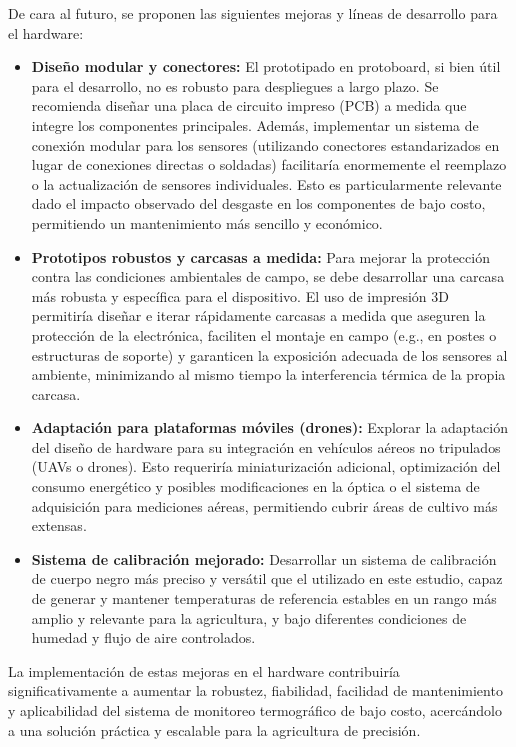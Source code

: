 De cara al futuro, se proponen las siguientes mejoras y líneas de desarrollo para el hardware:
\begin{itemize}
    \item \textbf{Diseño modular y conectores:} El prototipado en protoboard, si bien útil para el desarrollo, no es robusto para despliegues a largo plazo. Se recomienda diseñar una placa de circuito impreso (PCB) a medida que integre los componentes principales. Además, implementar un sistema de conexión modular para los sensores (utilizando conectores estandarizados en lugar de conexiones directas o soldadas) facilitaría enormemente el reemplazo o la actualización de sensores individuales. Esto es particularmente relevante dado el impacto observado del desgaste en los componentes de bajo costo, permitiendo un mantenimiento más sencillo y económico.
    \item \textbf{Prototipos robustos y carcasas a medida:} Para mejorar la protección contra las condiciones ambientales de campo, se debe desarrollar una carcasa más robusta y específica para el dispositivo. El uso de impresión 3D permitiría diseñar e iterar rápidamente carcasas a medida que aseguren la protección de la electrónica, faciliten el montaje en campo (e.g., en postes o estructuras de soporte) y garanticen la exposición adecuada de los sensores al ambiente, minimizando al mismo tiempo la interferencia térmica de la propia carcasa.
    \item \textbf{Adaptación para plataformas móviles (drones):} Explorar la adaptación del diseño de hardware para su integración en vehículos aéreos no tripulados (UAVs o drones). Esto requeriría miniaturización adicional, optimización del consumo energético y posibles modificaciones en la óptica o el sistema de adquisición para mediciones aéreas, permitiendo cubrir áreas de cultivo más extensas.
    \item \textbf{Sistema de calibración mejorado:} Desarrollar un sistema de calibración de cuerpo negro más preciso y versátil que el utilizado en este estudio, capaz de generar y mantener temperaturas de referencia estables en un rango más amplio y relevante para la agricultura, y bajo diferentes condiciones de humedad y flujo de aire controlados.
\end{itemize}

La implementación de estas mejoras en el hardware contribuiría significativamente a aumentar la robustez, fiabilidad, facilidad de mantenimiento y aplicabilidad del sistema de monitoreo termográfico de bajo costo, acercándolo a una solución práctica y escalable para la agricultura de precisión.
